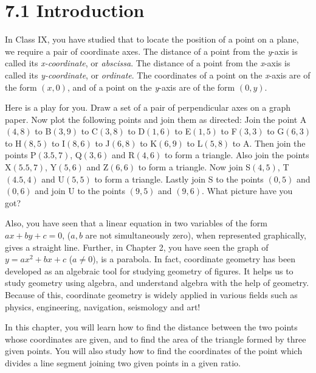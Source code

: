 \documentclass[a4paper,12pt]{article}
\begin{document}
\vspace{0.6cm}

\section*{\textcolor{cyan!80!blue}{7.1 Introduction}}

In Class IX, you have studied that to locate the position of a point on a plane, we require a pair of coordinate axes. The distance of a point from the \textit{y}-axis is called its \textit{x-coordinate}, or \textit{abscissa}. The distance of a point from the \textit{x}-axis is called its \textit{y-coordinate}, or \textit{ordinate}. The coordinates of a point on the \textit{x}-axis are of the form $(x, 0)$, and of a point on the \textit{y}-axis are of the form $(0, y)$.

Here is a play for you. Draw a set of a pair of perpendicular axes on a graph paper. Now plot the following points and join them as directed: Join the point A$(4, 8)$ to B$(3, 9)$ to C$(3, 8)$ to D$(1, 6)$ to E$(1, 5)$ to F$(3, 3)$ to G$(6, 3)$ to H$(8, 5)$ to I$(8, 6)$ to J$(6, 8)$ to K$(6, 9)$ to L$(5, 8)$ to A. Then join the points P$(3.5, 7)$, Q$(3, 6)$ and R$(4, 6)$ to form a triangle. Also join the points X$(5.5, 7)$, Y$(5, 6)$ and Z$(6, 6)$ to form a triangle. Now join S$(4, 5)$, T$(4.5, 4)$ and U$(5, 5)$ to form a triangle. Lastly join S to the points $(0, 5)$ and $(0, 6)$ and join U to the points $(9, 5)$ and $(9, 6)$. What picture have you got?

Also, you have seen that a linear equation in two variables of the form $ax + by + c = 0$, ($a, b$ are not simultaneously zero), when represented graphically, gives a straight line. Further, in Chapter 2, you have seen the graph of $y = ax^2 + bx + c$ ($a \ne 0$), is a parabola. In fact, coordinate geometry has been developed as an algebraic tool for studying geometry of figures. It helps us to study geometry using algebra, and understand algebra with the help of geometry. Because of this, coordinate geometry is widely applied in various fields such as physics, engineering, navigation, seismology and art!

In this chapter, you will learn how to find the distance between the two points whose coordinates are given, and to find the area of the triangle formed by three given points. You will also study how to find the coordinates of the point which divides a line segment joining two given points in a given ratio.
\end{document}
